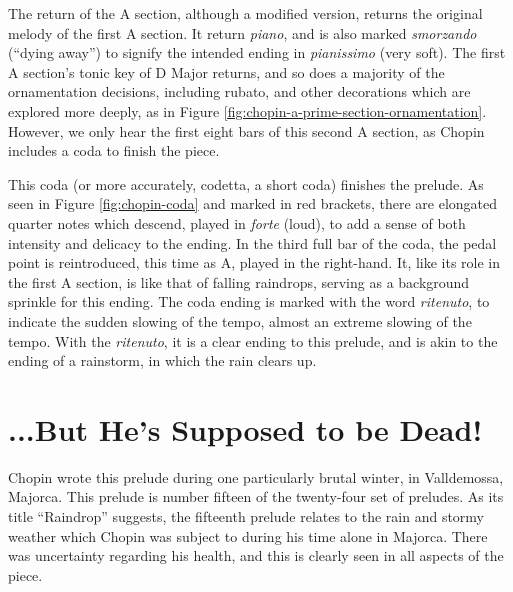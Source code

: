 The return of the A section, although a modified version, returns the original melody of the first A section. It return \textit{piano}, and is also marked \textit{smorzando} (``dying away'') to signify the intended ending in \textit{pianissimo} (very soft). The first A section's tonic key of D\musFlat{} Major returns, and so does a majority of the ornamentation decisions, including rubato, and other decorations which are explored more deeply, as in Figure \ref{fig:chopin-a-prime-section-ornamentation}\autocite{Hansen_1973}. However, we only hear the first eight bars of this second A section, as Chopin includes a coda to finish the piece.

This coda (or more accurately, codetta, a short coda) finishes the prelude. As seen in Figure \ref{fig:chopin-coda}\autocite{Hansen_1973} and marked in red brackets, there are elongated quarter notes which descend, played in \textit{forte} (loud), to add a sense of both intensity and delicacy to the ending. In the third full bar of the coda, the pedal point is reintroduced, this time as A\musFlat{}, played in the right-hand. It, like its role in the first A section, is like that of falling raindrops, serving as a background sprinkle for this ending. The coda ending is marked with the word \textit{ritenuto}\autocite{Cole_Schwartza}, to indicate the sudden slowing of the tempo, almost an extreme slowing of the tempo. With the \textit{ritenuto}, it is a clear ending to this prelude, and is akin to the ending of a rainstorm, in which the rain clears up.

\section{...But He's Supposed to be Dead!}\label{section:chopin-interpretation}

Chopin wrote this prelude during one particularly brutal winter, in Valldemossa, Majorca. This prelude is number fifteen of the twenty-four set of preludes. As its title ``Raindrop'' suggests, the fifteenth prelude relates to the rain and stormy weather which Chopin was subject to during his time alone in Majorca. There was uncertainty regarding his health, and this is clearly seen in all aspects of the piece.

